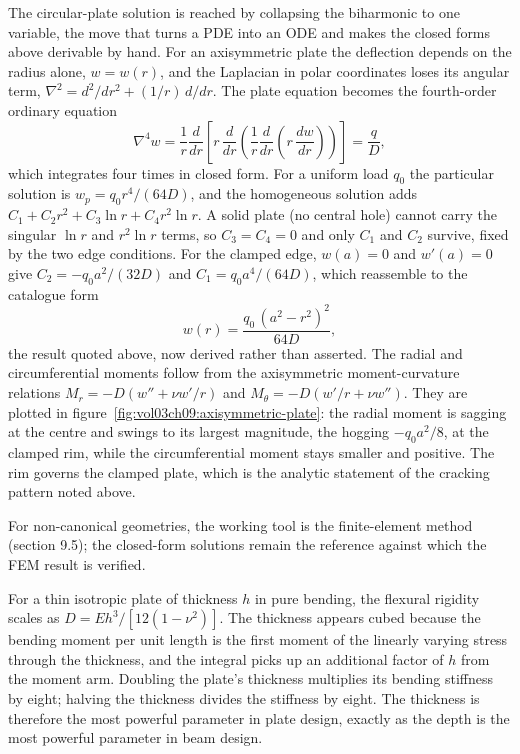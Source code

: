 The circular-plate solution is reached by collapsing the biharmonic to
one variable, the move that turns a PDE into an ODE and makes the
closed forms above derivable by hand. For an axisymmetric plate the
deflection depends on the radius alone, $w = w(r)$, and the Laplacian
in polar coordinates loses its angular term, $\nabla^2 = d^2/dr^2 +
(1/r)\,d/dr$. The plate equation becomes the fourth-order ordinary
equation
\[
\nabla^4 w = \frac{1}{r}\frac{d}{dr}\!\left[r\,\frac{d}{dr}\!\left(
\frac{1}{r}\frac{d}{dr}\!\left(r\,\frac{dw}{dr}\right)\right)\right]
= \frac{q}{D} ,
\]
which integrates four times in closed form. For a uniform load $q_0$
the particular solution is $w_p = q_0 r^4/(64 D)$, and the homogeneous
solution adds $C_1 + C_2 r^2 + C_3 \ln r + C_4 r^2 \ln r$. A solid
plate (no central hole) cannot carry the singular $\ln r$ and
$r^2 \ln r$ terms, so $C_3 = C_4 = 0$ and only $C_1$ and $C_2$ survive,
fixed by the two edge conditions. For the clamped edge, $w(a) = 0$ and
$w'(a) = 0$ give $C_2 = -q_0 a^2/(32 D)$ and $C_1 = q_0 a^4/(64 D)$,
which reassemble to the catalogue form
\[
w(r) = \frac{q_0\,(a^2 - r^2)^2}{64 D},
\]
the result quoted above, now derived rather than asserted. The radial
and circumferential moments follow from the axisymmetric
moment-curvature relations $M_r = -D(w'' + \nu w'/r)$ and
$M_\theta = -D(w'/r + \nu w'')$. They are plotted in
figure~\ref{fig:vol03ch09:axisymmetric-plate}: the radial moment is
sagging at the centre and swings to its largest magnitude, the hogging
$-q_0 a^2/8$, at the clamped rim, while the circumferential moment
stays smaller and positive. The rim governs the clamped plate, which is
the analytic statement of the cracking pattern noted above.



For non-canonical geometries, the working tool is the finite-element
method (section 9.5); the closed-form solutions remain the reference
against which the FEM result is verified.

\begin{principle}
For a thin isotropic plate of thickness $h$ in pure bending, the
flexural rigidity scales as $D = E h^3/[12(1-\nu^2)]$. The thickness
appears cubed because the bending moment per unit length is the
first moment of the linearly varying stress through the thickness,
and the integral picks up an additional factor of $h$ from the
moment arm. Doubling the plate's thickness multiplies its bending
stiffness by eight; halving the thickness divides the stiffness by
eight. The thickness is therefore the most powerful parameter in
plate design, exactly as the depth is the most powerful parameter
in beam design.
\end{principle}

